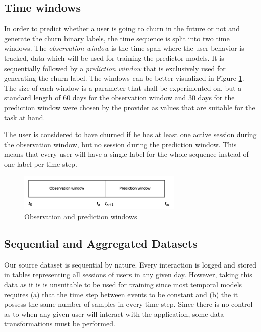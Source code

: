 \documentclass{kththesis}
\begin{document}
\subsection{Time windows}

In order to predict whether a user is going to churn in the future or not and generate the churn binary labels, the time sequence is split into two time windows. The \emph{observation window} is the time span where the user behavior is tracked, data which will be used for training the predictor models. It is sequentially followed by a \emph{prediction window} that is exclusively used for generating the churn label. The windows can be better visualized in Figure \ref{fig:timewindows}. The size of each window is a parameter that shall be experimented on, but a standard length of 60 days for the observation window and 30 days for the prediction window were chosen by the provider as values that are suitable for the task at hand.

The user is considered to have churned if he has at least one active session during the observation window, but no session during the prediction window. This means that every user will have a single label for the whole sequence instead of one label per time step. 

	\begin{figure}[h]
    \centering
    \includegraphics[width=0.7\textwidth, natwidth=580bp, natheight=313bp]{figures/obs_pred_windows.png}
    \caption{Observation and prediction windows}
    \label{fig:timewindows}
	\end{figure}


\subsection{Sequential and Aggregated Datasets}

Our source dataset is sequential by nature. Every interaction is logged and stored in tables representing all sessions of users in any given day. However, taking this data as it is is unsuitable to be used for training since most temporal models  requires (a) that the time step between events to be constant and (b) the it possess the same number of samples in every time step. Since there is no control as to when any given user will interact with the application, some data transformations must be performed.
\end{document}
